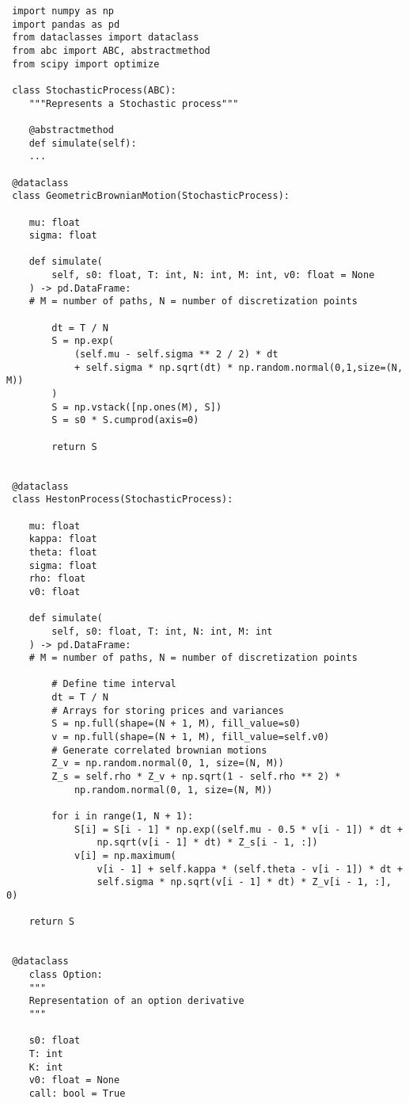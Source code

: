 \documentclass[12pt,a4paper,twoside,openany]{book}
\begin{document}
 	\vspace{4mm}	
 \begin{lstlisting}
 import numpy as np
 import pandas as pd
 from dataclasses import dataclass
 from abc import ABC, abstractmethod	
 from scipy import optimize
 
 class StochasticProcess(ABC):
 	"""Represents a Stochastic process"""
 
 	@abstractmethod
 	def simulate(self):
 	...
 
 @dataclass
 class GeometricBrownianMotion(StochasticProcess):
 
 	mu: float
 	sigma: float
 	
 	def simulate(
 		self, s0: float, T: int, N: int, M: int, v0: float = None
 	) -> pd.DataFrame:  
 	# M = number of paths, N = number of discretization points
 	
 		dt = T / N
 		S = np.exp(
 			(self.mu - self.sigma ** 2 / 2) * dt
 			+ self.sigma * np.sqrt(dt) * np.random.normal(0,1,size=(N, M))
 		)
 		S = np.vstack([np.ones(M), S])
 		S = s0 * S.cumprod(axis=0)
 
 		return S
 
 
 @dataclass
 class HestonProcess(StochasticProcess):
 
 	mu: float
 	kappa: float
 	theta: float
 	sigma: float
 	rho: float
 	v0: float
 	
 	def simulate(
 		self, s0: float, T: int, N: int, M: int
 	) -> pd.DataFrame:  
 	# M = number of paths, N = number of discretization points
 	
 		# Define time interval
 		dt = T / N
 		# Arrays for storing prices and variances
 		S = np.full(shape=(N + 1, M), fill_value=s0)
 		v = np.full(shape=(N + 1, M), fill_value=self.v0)
 		# Generate correlated brownian motions
 		Z_v = np.random.normal(0, 1, size=(N, M))
 		Z_s = self.rho * Z_v + np.sqrt(1 - self.rho ** 2) * 
 			np.random.normal(0, 1, size=(N, M))
 		
 		for i in range(1, N + 1):
 			S[i] = S[i - 1] * np.exp((self.mu - 0.5 * v[i - 1]) * dt + 
 				np.sqrt(v[i - 1] * dt) * Z_s[i - 1, :])
 			v[i] = np.maximum(
 				v[i - 1] + self.kappa * (self.theta - v[i - 1]) * dt + 
 				self.sigma * np.sqrt(v[i - 1] * dt) * Z_v[i - 1, :], 0)
 				
 	return S
 
 
 @dataclass
 	class Option:
 	"""
 	Representation of an option derivative
 	"""
 	
 	s0: float
 	T: int
 	K: int
 	v0: float = None
 	call: bool = True
 	

\end{lstlisting}
\end{document}
